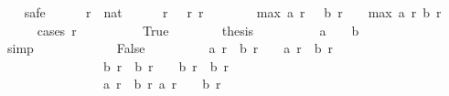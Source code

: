 \begin{isabellebody}
\ \ \isamarkupfalse%
\ safe\isanewline
\ \ \ \ \isamarkupfalse%
\ r\ {\isacharcolon}{\isacharcolon}\ nat\isanewline
\ \ \ \ \isamarkupfalse%
\ r{\isacharcolon}\ {\isachardoublequoteopen}{}\ {\isacharless}\ r{\isachardoublequoteclose}\ {\isachardoublequoteopen}r\ {\isacharless}\ {}{}{}{}{\isachardoublequoteclose}\isanewline
\ \ \ \ \isamarkupfalse%
\ {\isachardoublequoteopen}max\ {\isacharparenleft}a\ {\isacharparenleft}r\ {\isacharminus}\ {}{\isacharparenright}{\isacharparenright}\ {\isacharparenleft}b\ {\isacharparenleft}r\ {\isacharminus}\ {}{\isacharparenright}{\isacharparenright}\ {\isasymle}\ max\ {\isacharparenleft}a\ r{\isacharparenright}\ {\isacharparenleft}b\ r{\isacharparenright}{\isachardoublequoteclose}\isanewline
\ \ \ \ \isamarkupfalse%
\ {\isacharparenleft}cases\ {\isachardoublequoteopen}r\ {\isacharequal}\ {}{\isachardoublequoteclose}{\isacharparenright}\isanewline
\ \ \ \ \ \ \isamarkupfalse%
\ True\isanewline
\ \ \ \ \ \ \isamarkupfalse%
\ {\isacharquery}thesis\isanewline
\ \ \ \ \ \ \ \ \isamarkupfalse%
\ {\isacharbackquoteopen}a\ {}\ {\isacharequal}\ {}{\isacharbackquoteclose}\ {\isacharbackquoteopen}b\ {}\ {\isacharequal}\ {}{\isacharbackquoteclose}\isanewline
\ \ \ \ \ \ \ \ \isamarkupfalse%
\ simp\isanewline
\ \ \ \ \isamarkupfalse%
\isanewline
\ \ \ \ \ \ \isamarkupfalse%
\ False\isanewline
\ \ \ \ \ \ \isamarkupfalse%
\ \isamarkupfalse%
\ {\isachardoublequoteopen}a\ r\ {\isacharequal}\ b\ {\isacharparenleft}r\ {\isacharminus}\ {}{\isacharparenright}\ {\isasymor}\ a\ r\ {\isacharequal}\ b\ {\isacharparenleft}r\ {\isacharminus}\ {}{\isacharparenright}\ {\isacharplus}\ {}{\isachardoublequoteclose}\isanewline
\ \ \ \ \ \ \ \ \ \ \ \ \ \ \ \ {\isachardoublequoteopen}b\ r\ {\isacharequal}\ b\ {\isacharparenleft}r\ {\isacharminus}\ {}{\isacharparenright}\ {\isasymor}\ b\ r\ {\isacharequal}\ b\ {\isacharparenleft}r\ {\isacharminus}\ {}{\isacharparenright}\ {\isacharplus}\ {}{\isachardoublequoteclose}\isanewline
\ \ \ \ \ \ \ \ \ \ \ \ \ \ \ \ {\isachardoublequoteopen}a\ r\ {\isasymnoteq}\ b\ r{\isachardoublequoteclose}\ {\isachardoublequoteopen}a\ {\isacharparenleft}r\ {\isacharminus}\ {}{\isacharparenright}\ {\isasymnoteq}\ b\ {\isacharparenleft}r\ {\isacharminus}\ {}{\isacharparenright}{\isachardoublequoteclose}\isanewline

\end{isabellebody}
